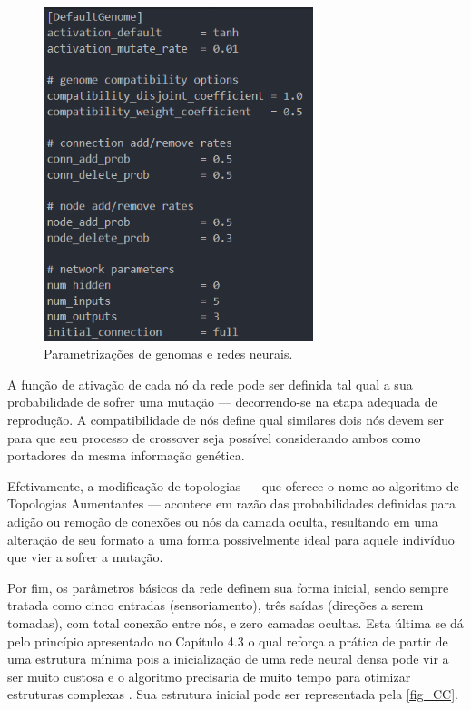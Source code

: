 \begin{figure}[htb]
        \centering
        \caption{\label{fig_CB}Parametrizações de genomas e redes neurais.}
        \includegraphics[width=0.7\textwidth]{images/CB.png}
\end{figure}

A função de ativação de cada nó da rede pode ser definida tal qual a sua probabilidade de sofrer uma mutação — decorrendo-se na etapa adequada de reprodução. A compatibilidade de nós define qual similares dois nós devem ser para que seu processo de crossover seja possível considerando ambos como portadores da mesma informação genética.

Efetivamente, a modificação de topologias — que oferece o nome ao algoritmo de Topologias Aumentantes — acontece em razão das probabilidades definidas para adição ou remoção de conexões ou nós da camada oculta, resultando em uma alteração de seu formato a uma forma possivelmente ideal para aquele indivíduo que vier a sofrer a mutação.

Por fim, os parâmetros básicos da rede definem sua forma inicial, sendo sempre tratada como cinco entradas (sensoriamento), três saídas (direções a serem tomadas), com total conexão entre nós, e zero camadas ocultas. Esta última se dá pelo princípio apresentado no Capítulo 4.3 o qual reforça a prática de partir de uma estrutura mínima pois a inicialização de uma rede neural densa pode vir a ser muito custosa e o algoritmo precisaria de muito tempo para otimizar estruturas complexas \cite{stanley2004neat}. Sua estrutura inicial pode ser representada pela \autoref{fig_CC}.

